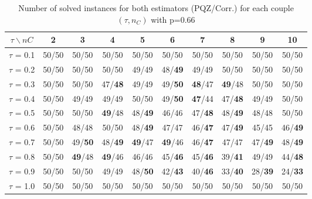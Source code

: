 \begin{table}[H]
\centering


\begin{tabular}{|c|c|c|c|c|c|c|c|c|c|}
\hline
$\tau \backslash nC$ & 2 & 3 & 4 & 5 & 6 & 7 & 8 & 9 & 10 \\
\hline
$\tau$ = 0.1 & 50/50 & 50/50 & 50/50 & 50/50 & 50/50 & 50/50 & 50/50 & 50/50 & 50/50 \\
\hline
$\tau$ = 0.2 & 50/50 & 50/50 & 50/50 & 49/49 & 48/\textbf{49} & 49/49 & 50/50 & 50/50 & 50/50 \\
\hline
$\tau$ = 0.3 & 50/50 & 50/50 & 47/\textbf{48} & 49/49 & 49/\textbf{50} & \textbf{48}/47 & \textbf{49}/48 & 50/50 & 50/50 \\
\hline
$\tau$ = 0.4 & 50/50 & 49/49 & 49/49 & 50/50 & 49/\textbf{50} & \textbf{47}/44 & 47/\textbf{48} & 49/49 & 50/50 \\
\hline
$\tau$ = 0.5 & 50/50 & 50/50 & \textbf{49}/48 & 48/\textbf{49} & 46/46 & 47/\textbf{48} & 48/\textbf{49} & 48/48 & 50/50 \\
\hline
$\tau$ = 0.6 & 50/50 & 48/48 & 50/50 & 48/\textbf{49} & 47/47 & 46/\textbf{47} & 47/\textbf{49} & 45/45 & 46/\textbf{49} \\
\hline
$\tau$ = 0.7 & 50/50 & 49/\textbf{50} & 48/\textbf{49} & \textbf{49}/47 & \textbf{49}/46 & 46/\textbf{47} & 47/47 & 47/\textbf{49} & 48/\textbf{49} \\
\hline
$\tau$ = 0.8 & 50/50 & \textbf{49}/48 & \textbf{49}/46 & 46/46 & 45/\textbf{46} & 45/\textbf{46} & 39/\textbf{41} & 49/49 & 44/\textbf{48} \\
\hline
$\tau$ = 0.9 & 50/50 & 50/50 & 49/49 & 48/\textbf{50} & 42/\textbf{43} & 40/\textbf{46} & 33/\textbf{40} & 28/\textbf{39} & 24/\textbf{33} \\
\hline
$\tau$ = 1.0 & 50/50 & 50/50 & 50/50 & 50/50 & 50/50 & 50/50 & 50/50 & 50/50 & 50/50 \\
\hline
\end{tabular}

~	\caption{Number of solved instances for both estimators (PQZ/Corr.) for each couple $(\tau, n_C)$ with p=0.66}
    \label{nbSolved066}
\end{table}
